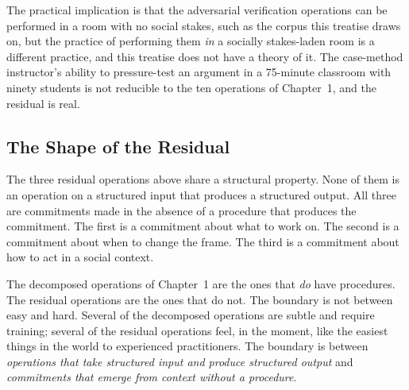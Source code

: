 \documentclass[11pt]{article}
\begin{document}
The practical implication is that the adversarial verification operations can be performed in a room with no social stakes, such as the corpus this treatise draws on, but the practice of performing them \emph{in} a socially stakes-laden room is a different practice, and this treatise does not have a theory of it. The case-method instructor's ability to pressure-test an argument in a 75-minute classroom with ninety students is not reducible to the ten operations of Chapter~1, and the residual is real.

\subsection{The Shape of the Residual}

The three residual operations above share a structural property. None of them is an operation on a structured input that produces a structured output. All three are commitments made in the absence of a procedure that produces the commitment. The first is a commitment about what to work on. The second is a commitment about when to change the frame. The third is a commitment about how to act in a social context.

The decomposed operations of Chapter~1 are the ones that \emph{do} have procedures. The residual operations are the ones that do not. The boundary is not between easy and hard. Several of the decomposed operations are subtle and require training; several of the residual operations feel, in the moment, like the easiest things in the world to experienced practitioners. The boundary is between \emph{operations that take structured input and produce structured output} and \emph{commitments that emerge from context without a procedure}.
\end{document}
